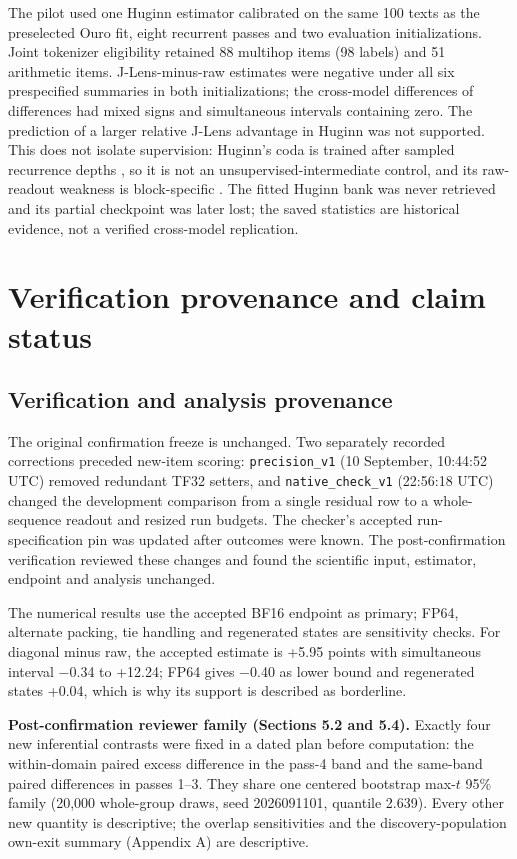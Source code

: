 The pilot used one Huginn estimator calibrated on the same 100 texts as
the preselected Ouro fit, eight recurrent passes and two evaluation
initializations. Joint tokenizer eligibility retained 88 multihop items
(98 labels) and 51 arithmetic items. J-Lens-minus-raw estimates were
negative under all six prespecified summaries in both initializations;
the cross-model differences of differences had mixed signs and
simultaneous intervals containing zero. The prediction of a larger
relative J-Lens advantage in Huginn was not supported. This does not
isolate supervision: Huginn's coda is trained after sampled recurrence
depths \citep{geiping2025huginn}, so it is not an
unsupervised-intermediate control, and its raw-readout weakness is
block-specific \citep{lu2025latentcot}. The fitted Huginn bank was never
retrieved and its partial checkpoint was later lost; the saved
statistics are historical evidence, not a verified cross-model
replication.

\section{Verification provenance and claim status}\label{app:B}

\subsection{Verification and analysis
provenance}\label{verification-and-analysis-provenance}

The original confirmation freeze is unchanged. Two separately recorded
corrections preceded new-item scoring: \texttt{precision\_v1} (10
September, 10:44:52 UTC) removed redundant TF32 setters, and
\texttt{native\_check\_v1} (22:56:18 UTC) changed the development
comparison from a single residual row to a whole-sequence readout and
resized run budgets. The checker's accepted run-specification pin was
updated after outcomes were known. The post-confirmation verification
reviewed these changes and found the scientific input, estimator,
endpoint and analysis unchanged.

The numerical results use the accepted BF16 endpoint as primary; FP64,
alternate packing, tie handling and regenerated states are sensitivity
checks. For diagonal minus raw, the accepted estimate is +5.95 points
with simultaneous interval −0.34 to +12.24; FP64 gives −0.40 as lower
bound and regenerated states +0.04, which is why its support is
described as borderline.

\textbf{Post-confirmation reviewer family (Sections 5.2 and 5.4).}
Exactly four new inferential contrasts were fixed in a dated plan before
computation: the within-domain paired excess difference in the pass-4
band and the same-band paired differences in passes 1--3. They share one
centered bootstrap max-\(t\) 95\% family (20,000 whole-group draws, seed
2026091101, quantile 2.639). Every other new quantity is descriptive;
the overlap sensitivities and the discovery-population own-exit summary
(Appendix A) are descriptive.

